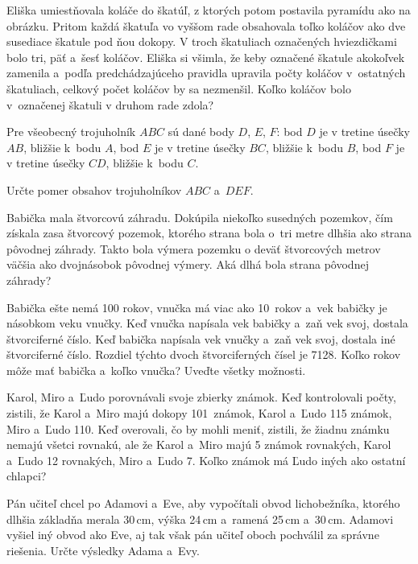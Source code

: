 {%
Eliška umiestňovala koláče do škatúľ, z ktorých potom postavila pyramídu ako na obrázku.
Pritom každá škatuľa vo vyššom rade obsahovala toľko koláčov ako dve susediace škatule pod ňou dokopy.
V troch škatuliach označených hviezdičkami bolo tri, päť a~šesť koláčov.
Eliška si všimla, že keby označené škatule akokoľvek zamenila a~podľa predchádzajúceho pravidla upravila počty koláčov v~ostatných škatuliach, celkový počet koláčov by sa nezmenšil.
Koľko koláčov bolo v~označenej škatuli v druhom rade zdola?
\ifobrazkyvedla\else{}\fi%
}

{%
Pre všeobecný trojuholník $ABC$ sú dané body $D$, $E$, $F$:
\itemitem{$\bullet$} bod $D$ je v tretine úsečky $AB$, bližšie k~bodu $A$,
\itemitem{$\bullet$} bod $E$ je v tretine úsečky $BC$, bližšie k~bodu $B$,
\itemitem{$\bullet$} bod $F$ je v tretine úsečky $CD$, bližšie k~bodu $C$.

Určte pomer obsahov trojuholníkov $ABC$ a~$DEF$.
}

{%
Babička mala štvorcovú záhradu. Dokúpila niekoľko susedných pozemkov, čím získala zasa štvorcový pozemok, ktorého strana bola o~tri metre dlhšia ako strana pôvodnej záhrady.
Takto bola výmera pozemku o deväť štvorcových metrov väčšia ako dvojnásobok pôvodnej výmery.
Aká dlhá bola strana pôvodnej záhrady?
}

{%
Babička ešte nemá 100 rokov, vnučka má viac ako 10~rokov a~vek babičky je násobkom veku vnučky.
Keď vnučka napísala vek babičky a~zaň vek svoj, dostala štvorciferné číslo.
Keď babička napísala vek vnučky a~zaň vek svoj, dostala iné štvorciferné číslo.
Rozdiel týchto dvoch štvorciferných čísel je 7128.
Koľko rokov môže mať babička a~koľko vnučka?
Uveďte všetky možnosti.
}

{%
Karol, Miro a~Ľudo porovnávali svoje zbierky známok.
Keď kontrolovali počty, zistili, že
Karol a~Miro majú dokopy 101~známok,
Karol a~Ľudo 115 známok,
Miro a~Ľudo 110.
Keď overovali, čo by mohli meniť, zistili, že žiadnu známku nemajú všetci rovnakú, ale že
Karol a~Miro majú 5 známok rovnakých,
Karol a~Ľudo 12 rovnakých,
Miro a~Ľudo 7.
Koľko známok má Ľudo iných ako ostatní chlapci?}

{%
Pán učiteľ chcel po Adamovi a~Eve, aby vypočítali obvod lichobežníka, ktorého dlhšia základňa merala 30\,cm, výška 24\,cm a~ramená 25\,cm a~30\,cm.
Adamovi vyšiel iný obvod ako Eve, aj tak však pán učiteľ oboch pochválil za správne riešenia.
Určte výsledky Adama a~Evy.}

